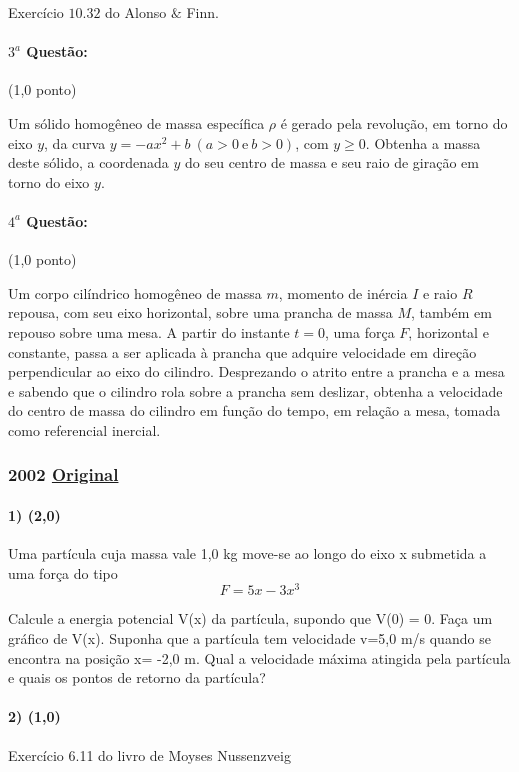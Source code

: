 \documentclass[12pt,a4paper]{article}
\newcommand{\original}[1]{\tiny \href{#1}{Original} \normalsize}
\begin{document}
Exercício $10.32$ do Alonso $\&$ Finn.

\paragraph{$3^a$ Questão:} (1,0 ponto)

Um sólido homogêneo de massa específica $\rho$ é gerado pela revolução, em torno do eixo $y$, da curva $y=-ax^2+b \ (a>0 \ \textrm{e} \ b>0)$, com $y \geq 0$. Obtenha
a massa deste sólido, a coordenada $y$ do seu centro de massa e seu raio de giração em torno do eixo $y$.

\paragraph{$4^a$ Questão:} (1,0 ponto)

Um corpo cilíndrico homogêneo de massa $m$, momento de inércia $I$ e raio $R$ repousa, com seu eixo horizontal, sobre uma prancha de massa $M$, também em repouso sobre uma mesa. A partir
do instante $t=0$, uma força $F$, horizontal e constante, passa a ser aplicada à prancha que adquire velocidade em direção perpendicular ao eixo do cilindro. Desprezando o atrito entre a prancha e a mesa e sabendo que o cilindro 
rola sobre a prancha sem deslizar, obtenha a velocidade do centro de massa do cilindro em função do tempo, em relação a mesa, tomada como referencial inercial.

\newpage

\subsubsection{2002 \original{https://drive.google.com/open?id=1tepTtUD4Wowc0J89mcTBJcg7TE7NjEm_}}

\paragraph{1) (2,0)} Uma partícula cuja massa vale 1,0 kg move-se ao longo do eixo x submetida a uma força do tipo $$F=5x - 3x^3$$
\begin{tasks}
\task Calcule a energia potencial V(x) da partícula, supondo que V(0) = 0. Faça um gráfico de V(x).
\task Suponha que a partícula tem velocidade v=5,0 m/s quando se encontra na posição x= -2,0 m. Qual a velocidade máxima atingida pela partícula e quais os pontos de retorno da partícula?
\end{tasks}

\paragraph{2) (1,0)} Exercício 6.11 do livro de Moyses Nussenzveig
\end{document}
